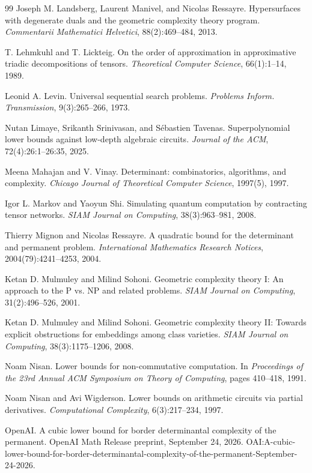 \begin{thebibliography}{99}
Joseph M. Landsberg, Laurent Manivel, and Nicolas Ressayre. Hypersurfaces with degenerate
duals and the geometric complexity theory program. \emph{Commentarii Mathematici Helvetici},
88(2):469--484, 2013.

T. Lehmkuhl and T. Lickteig. On the order of approximation in approximative triadic decompositions
of tensors. \emph{Theoretical Computer Science}, 66(1):1--14, 1989.

Leonid A. Levin. Universal sequential search problems. \emph{Problems Inform. Transmission},
9(3):265--266, 1973.

Nutan Limaye, Srikanth Srinivasan, and Sébastien Tavenas. Superpolynomial lower bounds
against low-depth algebraic circuits. \emph{Journal of the ACM}, 72(4):26:1--26:35, 2025.

Meena Mahajan and V. Vinay. Determinant: combinatorics, algorithms, and complexity. \emph{Chicago
Journal of Theoretical Computer Science}, 1997(5), 1997.

Igor L. Markov and Yaoyun Shi. Simulating quantum computation by contracting tensor
networks. \emph{SIAM Journal on Computing}, 38(3):963--981, 2008.

Thierry Mignon and Nicolas Ressayre. A quadratic bound for the determinant and permanent
problem. \emph{International Mathematics Research Notices}, 2004(79):4241--4253, 2004.

Ketan D. Mulmuley and Milind Sohoni. Geometric complexity theory I: An approach to the P
vs. NP and related problems. \emph{SIAM Journal on Computing}, 31(2):496--526, 2001.

Ketan D. Mulmuley and Milind Sohoni. Geometric complexity theory II: Towards explicit
obstructions for embeddings among class varieties. \emph{SIAM Journal on Computing}, 38(3):1175--1206, 2008.

Noam Nisan. Lower bounds for non-commutative computation. In \emph{Proceedings of the 23rd
Annual ACM Symposium on Theory of Computing}, pages 410--418, 1991.

Noam Nisan and Avi Wigderson. Lower bounds on arithmetic circuits via partial derivatives.
\emph{Computational Complexity}, 6(3):217--234, 1997.

\setcounter{enumiv}{58}
OpenAI. A cubic lower bound for border determinantal complexity of the permanent. OpenAI
Math Release preprint, September 24, 2026.
OAI:A-cubic-lower-bound-for-border-determinantal-complexity-of-the-permanent-September-24-2026.


\end{thebibliography}
